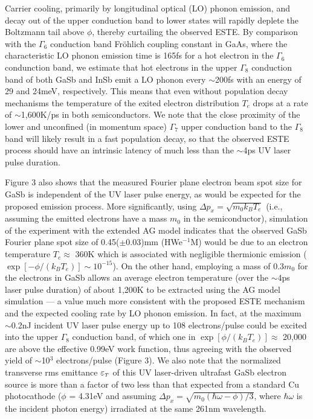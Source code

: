 Carrier cooling, primarily by longitudinal optical (LO) phonon emission, and decay out of the upper conduction band to lower states will rapidly deplete the Boltzmann tail above $\phi$, thereby curtailing the observed ESTE.
By comparison with the $\Gamma_6$ conduction band Fr\"ohlich coupling constant in GaAs, where the characteristic LO phonon emission time is 165fs for a hot electron in the $\Gamma_6$ condunction band\cite{kash_subpicosecond_1985}, we estimate that hot electrons in the upper $\Gamma_8$ conduction band of both GaSb and InSb emit a LO phonon every $\sim$200fs with an energy of 29 and 24meV, respectively.
This means that even without population decay mechanisms the temperature of the exited electron distribution $T_e$ drops at a rate of $\sim$1,600K/ps in both semiconductors.
We note that the close proximity of the lower and unconfined (in momentum space) $\Gamma_7$ upper conduction band to the $\Gamma_8$ band will likely result in a fast population decay, so that the observed ESTE process should have an intrinsic latency of much less than the $\sim$4ps UV laser pulse duration.

Figure 3 also shows that the measured Fourier plane electron beam spot size for GaSb is independent of the UV laser pulse energy, as would be expected for the proposed emission process.
More significantly, using $\Delta p_x = \sqrt{m_0 k_B T_e}$ (i.e., assuming the emitted electrons have a mass $m_0$ in the semiconductor), simulation of the experiment with the extended AG model\cite{berger_semi-analytic_2010} indicates that the observed GaSb Fourier plane spot size of 0.45($\pm$0.03)mm (HWe$^{-1}$M) would be due to an electron temperature $T_e \approx$ 360K which is associated with negligible thermionic emission ($\exp[-\phi/(k_B T_e)] \sim 10^{-15}$).
On the other hand, employing a mass of 0.3$m_0$ for the electrons in GaSb allows an average electron temperature (over the $\sim$4ps laser pulse duration) of about 1,200K to be extracted using the AG model simulation --- a value much more consistent with the proposed ESTE mechanism and the expected cooling rate by LO phonon emission.
In fact, at the maximum $\sim$0.2nJ incident UV laser pulse energy up to 108 electrons/pulse could be excited into the upper $\Gamma_8$ conduction band, of which one in $\exp[\phi/(k_B T_e)] \approx$ 20,000 are above the effective 0.99eV work function, thus agreeing with the observed yield of $\sim$10$^3$ electrons/pulse (Figure 3).
We also note that the normalized transverse rms emittance $\varepsilon_{{\scriptscriptstyle T}}$ of this UV laser-driven ultrafast GaSb electron source is more than a factor of two less than that expected from a standard Cu photocathode ($\phi$ = 4.31eV and assuming $\Delta p_x = \sqrt{m_0 ( \hbar \omega - \phi ) / 3 }$, where $\hbar \omega$ is the incident photon energy\cite{dowell_quantum_2009,jensen_emittance_2010}) irradiated at the same 261nm wavelength.

